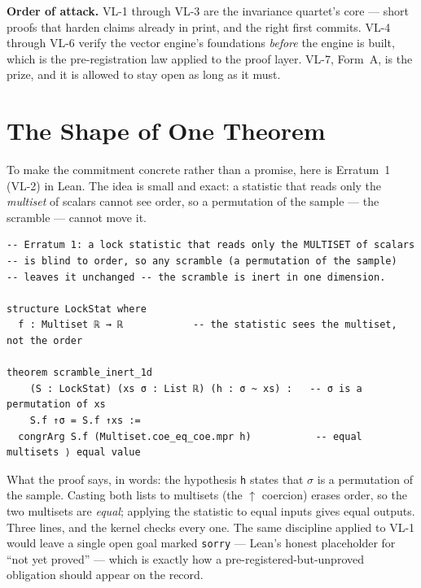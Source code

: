 \documentclass[11pt, letterpaper, openany]{book}
\begin{document}
\begin{warningbox}
\textbf{Order of attack.} VL-1 through VL-3 are the invariance quartet's core --- short proofs that
harden claims already in print, and the right first commits. VL-4 through VL-6 verify the vector
engine's foundations \emph{before} the engine is built, which is the pre-registration law applied to
the proof layer. VL-7, Form~A, is the prize, and it is allowed to stay open as long as it must.
\end{warningbox}

\section{The Shape of One Theorem}

To make the commitment concrete rather than a promise, here is Erratum~1 (VL-2) in Lean. The idea is
small and exact: a statistic that reads only the \emph{multiset} of scalars cannot see order, so a
permutation of the sample --- the scramble --- cannot move it.

\begin{lstlisting}[style=lean, caption={VL-2, the shape of it. Schematic Lean 4; Mathlib lemma names may need adjustment on first compile.}, captionpos=b]
-- Erratum 1: a lock statistic that reads only the MULTISET of scalars
-- is blind to order, so any scramble (a permutation of the sample)
-- leaves it unchanged -- the scramble is inert in one dimension.

structure LockStat where
  f : Multiset ℝ → ℝ            -- the statistic sees the multiset, not the order

theorem scramble_inert_1d
    (S : LockStat) (xs σ : List ℝ) (h : σ ~ xs) :   -- σ is a permutation of xs
    S.f ↑σ = S.f ↑xs :=
  congrArg S.f (Multiset.coe_eq_coe.mpr h)           -- equal multisets ⟩ equal value
\end{lstlisting}

\begin{derivbox}
What the proof says, in words: the hypothesis \texttt{h} states that $\sigma$ is a
permutation of the sample. Casting both lists to multisets (the $\uparrow$ coercion) erases order, so
the two multisets are \emph{equal}; applying the statistic to equal inputs gives equal outputs. Three
lines, and the kernel checks every one. The same discipline applied to VL-1 would leave a single open
goal marked \texttt{sorry} --- Lean's honest placeholder for ``not yet proved'' --- which is exactly
how a pre-registered-but-unproved obligation should appear on the record.
\end{derivbox}
\end{document}
